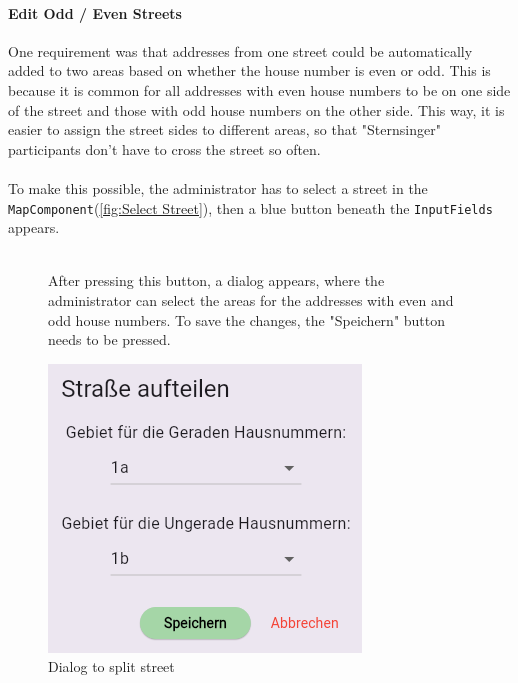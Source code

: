 \paragraph{Edit Odd / Even Streets}
One requirement was that addresses from one street could be automatically added to two areas based on whether the house number is even or odd. This is because it is common for all addresses with even house numbers to be on one side of the street and those with odd house numbers on the other side. This way, it is easier to assign the street sides to different areas, so that "Sternsinger" participants don't have to cross the street so often.\\\\
To make this possible, the administrator has to select a street in the \texttt{MapComponent}(\ref{fig:Select Street}), then a blue button beneath the \texttt{InputFields} appears. \\
\\
\begin{figure}[H]
    \begin{minipage}{0.7\textwidth}
        After pressing this button, a dialog appears, where the administrator can select the areas for the addresses with even and odd house numbers. To save the changes, the "Speichern" button needs to be pressed.
    \end{minipage}
    \hfill
    \begin{minipage}{0.25\textwidth}
        \centering
        \includegraphics[width=\linewidth]{images/AdminPanel/splitStreetDialog.png}
        \caption{Dialog to split street}
    \end{minipage}
\end{figure}


